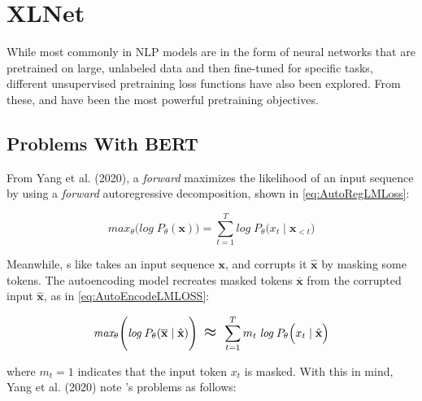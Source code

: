 \section{XLNet} \label{sec:XLNet}

While most commonly in NLP models are in the form of neural networks that are pretrained on large, unlabeled data and then fine-tuned for specific tasks, different unsupervised pretraining loss functions have also been explored. From these,  and  have been the most powerful pretraining objectives. 


\subsection{Problems With BERT}

From Yang et al. (2020), a \emph{forward}  maximizes the likelihood of an input sequence by using a \emph{forward} autoregressive decomposition, shown in \cref{eq:AutoRegLMLoss}:

\begin{equation}
\textit{max}_\theta \Bigg( \textit{log}  \; P_\theta(\textbf{x})  \Bigg) = \sum_{t=1}^T \textit{log} \; P_\theta \Big(x_t \; | \; \textbf{x}_{< t} \Big)  
\label{eq:AutoRegLMLoss}
\end{equation}


Meanwhile, s like  takes an input sequence $\textbf{x}$, and corrupts it $\hat{\textbf{x}}$ by masking some tokens. The autoencoding model recreates masked tokens $\overline{\textbf{x}}$ from the corrupted input $\hat{\textbf{x}}$, as in \cref{eq:AutoEncodeLMLOSS}:

\begin{equation}
\textit{max}_\theta \Bigg( \textit{log}  \; P_\theta(\overline{\textbf{x}} \; | \; \hat{\textbf{x}})  \Bigg) \;\; \mathlarger{\mathlarger{\approx}} \;\; \sum_{t=1}^T m_t \; \textit{log} \; P_\theta \Big(x_t \; | \; \hat{\textbf{x}} \Big) 
\label{eq:AutoEncodeLMLOSS}
\end{equation}

where $m_t = 1$ indicates that the input token $x_t$ is masked. With this in mind, Yang et al. (2020) note 's problems as follows: 


